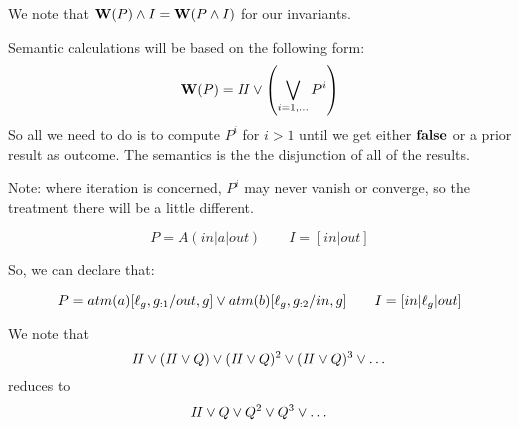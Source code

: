 We note that $\mathbf{W}(P) \land I = \mathbf{W}(P \land I)$ for our invariants.

\newpage
{}

Semantic calculations will be based on the following form:
\[
  \mathbf{W}(P) = \mathit{II} \lor \left(\bigvee_{i=1,\dots} P^i\right)
\]
So all we need to do is to compute $P^i$ for $i>1$
until we get either $\mathbf{false}$ or a prior result as outcome.
The semantics is the the disjunction of all of the results.

Note: where iteration is concerned, $P^i$ may never vanish
or converge, so the treatment there will be a little different.



\[ P = A(in|a|out) \qquad I = [in|out] \]


So, we can declare that:

\newpage
{}

\[ P =  atm(a)[\ell_g,g_{:1}/out,g] \lor
       atm(b)[\ell_g,g_{:2}/in,g]\qquad I = [in|\ell_g|out] \]


We note that
\[
 \mathit{II} \lor (\mathit{II} \lor Q) \lor (\mathit{II} \lor Q)^2
 \lor (\mathit{II} \lor Q)^3 \lor \dots
\]
reduces to
\[
 \mathit{II} \lor Q \lor Q^2 \lor Q^3 \lor \dots
\]

